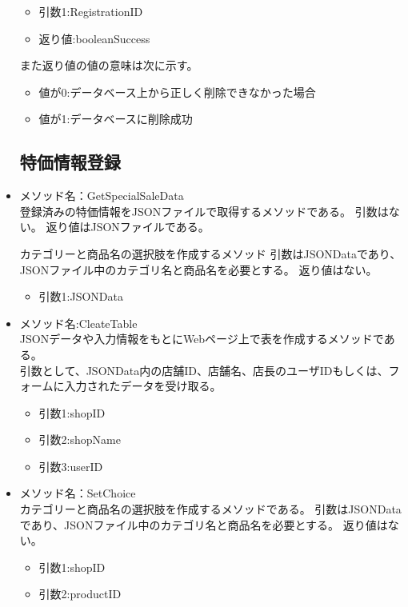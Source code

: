 \documentclass[a4j]{jarticle}
\begin{document}
\begin{itemize}
	\begin{itemize}
		\item 引数1:RegistrationID
		\item 返り値:booleanSuccess
	\end{itemize}
また返り値の値の意味は次に示す。
	\begin{itemize}
		\item 値が0:データベース上から正しく削除できなかった場合
		\item 値が1:データベースに削除成功
	\end{itemize}
\subsection{特価情報登録}
%
\item メソッド名：GetSpecialSaleData\\

登録済みの特価情報をJSONファイルで取得するメソッドである。
引数はない。
返り値はJSONファイルである。

カテゴリーと商品名の選択肢を作成するメソッド
引数はJSONDataであり、JSONファイル中のカテゴリ名と商品名を必要とする。
返り値はない。
	\begin{itemize}
		\item 引数1:JSONData
	\end{itemize}
	\item メソッド名:CleateTable\\
JSONデータや入力情報をもとにWebページ上で表を作成するメソッドである。\\
引数として、JSONData内の店舗ID、店舗名、店長のユーザIDもしくは、フォームに入力されたデータを受け取る。
	\begin{itemize}	
		\item 引数1:shopID
		\item 引数2:shopName
		\item 引数3:userID
	\end{itemize}
\item メソッド名：SetChoice\\

カテゴリーと商品名の選択肢を作成するメソッドである。
引数はJSONDataであり、JSONファイル中のカテゴリ名と商品名を必要とする。
返り値はない。
	\begin{itemize}
		\item 引数1:shopID
		\item 引数2:productID
	\end{itemize}
			

\end{itemize}
\end{document}

